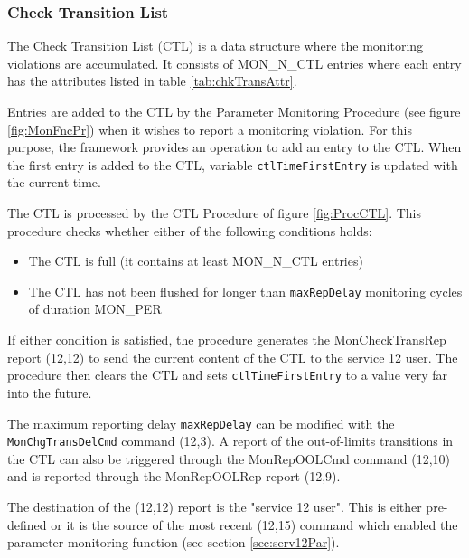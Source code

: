 \documentclass{pnp_article}
\begin{document}
\subsubsection{Check Transition List}\label{sec:ChkTransList}
The Check Transition List (CTL) is a data structure where the monitoring violations are accumulated. It consists of MON\_N\_CTL entries where each entry has the attributes listed in table \ref{tab:chkTransAttr}.

Entries are added to the CTL by the Parameter Monitoring Procedure (see figure \ref{fig:MonFncPr}) when it wishes to report a monitoring violation. For this purpose, the framework provides an operation to add an entry to the CTL. When the first entry is added to the CTL, variable \texttt{ctlTimeFirstEntry} is updated with the current time.

The CTL is processed by the CTL Procedure of figure \ref{fig:ProcCTL}. This procedure checks whether either of the following conditions holds:

\begin{itemize}
\item The CTL is full (it contains at least MON\_N\_CTL entries)
\item The CTL has not been flushed for longer than \texttt{maxRepDelay} monitoring cycles of duration MON\_PER
\end{itemize}
 
If either condition is satisfied, the procedure generates the MonCheckTransRep report (12,12) to send the current content of the CTL to the service 12 user. The procedure then clears the CTL and sets \texttt{ctlTimeFirstEntry} to a value very far into the future.

The maximum reporting delay \texttt{maxRepDelay} can be modified with the \texttt{MonChgTransDelCmd} command (12,3). A report of the out-of-limits transitions in the CTL can also be triggered through the MonRepOOLCmd command (12,10) and is reported through the MonRepOOLRep report (12,9). 

The destination of the (12,12) report is the "service 12 user". This is either pre-defined or it is the source of the most recent (12,15) command which enabled the parameter monitoring function (see section \ref{sec:serv12Par}).
\end{document}

